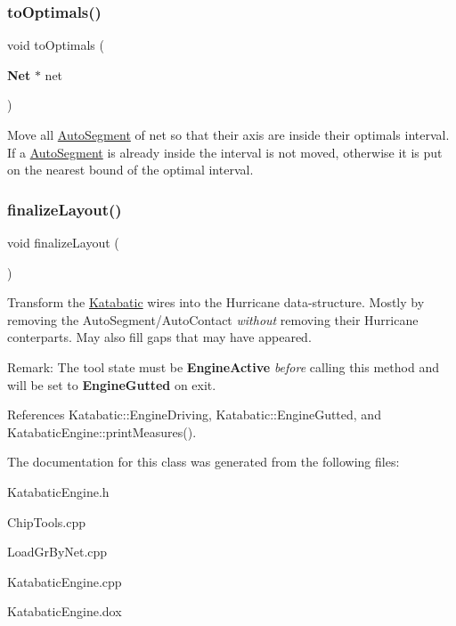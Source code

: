 \subsubsection{\texorpdfstring{to\+Optimals()}{toOptimals()}}
{\footnotesize\ttfamily void to\+Optimals (\begin{DoxyParamCaption}\item[{\textbf{ Net} $\ast$}]{net }\end{DoxyParamCaption})}

Move all \mbox{\hyperlink{classKatabatic_1_1AutoSegment}{Auto\+Segment}} of {\ttfamily net} so that their axis are inside their optimals interval. If a \mbox{\hyperlink{classKatabatic_1_1AutoSegment}{Auto\+Segment}} is already inside the interval is not moved, otherwise it is put on the nearest bound of the optimal interval. \mbox{\label{classKatabatic_1_1KatabaticEngine_a468eddb683c04cfeea1c5124a39e1f86}} 
\subsubsection{\texorpdfstring{finalize\+Layout()}{finalizeLayout()}}
{\footnotesize\ttfamily void finalize\+Layout (\begin{DoxyParamCaption}{ }\end{DoxyParamCaption})\hspace{0.3cm}{\ttfamily [virtual]}}

Transform the \mbox{\hyperlink{namespaceKatabatic}{Katabatic}} wires into the Hurricane data-\/structure. Mostly by removing the Auto\+Segment/\+Auto\+Contact {\itshape without} removing their Hurricane conterparts. May also fill gaps that may have appeared.

\begin{DoxyParagraph}{Remark\+: The tool state must be {\bfseries Engine\+Active} {\itshape before} calling this method}
and will be set to {\bfseries Engine\+Gutted} on exit. 
\end{DoxyParagraph}


References Katabatic\+::\+Engine\+Driving, Katabatic\+::\+Engine\+Gutted, and Katabatic\+Engine\+::print\+Measures().



The documentation for this class was generated from the following files\+:\begin{DoxyCompactItemize}
\item 
Katabatic\+Engine.\+h\item 
Chip\+Tools.\+cpp\item 
Load\+Gr\+By\+Net.\+cpp\item 
Katabatic\+Engine.\+cpp\item 
Katabatic\+Engine.\+dox\end{DoxyCompactItemize}
